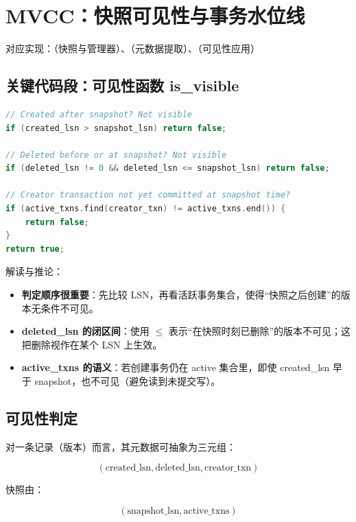 \section{MVCC：快照可见性与事务水位线}

对应实现：（快照与管理器）、（元数据提取）、（可见性应用）

\subsection{关键代码段：可见性函数 is\_visible}

\begin{lstlisting}[language=C++,caption={MVCCSnapshot::is\_visible 的判定顺序（节选）}]
// Created after snapshot? Not visible
if (created_lsn > snapshot_lsn) return false;

// Deleted before or at snapshot? Not visible
if (deleted_lsn != 0 && deleted_lsn <= snapshot_lsn) return false;

// Creator transaction not yet committed at snapshot time?
if (active_txns.find(creator_txn) != active_txns.end()) {
    return false;
}
return true;
\end{lstlisting}

解读与推论：

\begin{itemize}
  \item \textbf{判定顺序很重要}：先比较 LSN，再看活跃事务集合，使得“快照之后创建”的版本无条件不可见。
  \item \textbf{deleted\_lsn 的闭区间}：使用 \(\le\) 表示“在快照时刻已删除”的版本不可见；这把删除视作在某个 LSN 上生效。
  \item \textbf{active\_txns 的语义}：若创建事务仍在 active 集合里，即使 created\_lsn 早于 snapshot，也不可见（避免读到未提交写）。
\end{itemize}

\subsection{可见性判定}

对一条记录（版本）而言，其元数据可抽象为三元组：

\[
(\text{created\_lsn}, \text{deleted\_lsn}, \text{creator\_txn})
\]

快照由：

\[
(\text{snapshot\_lsn}, \text{active\_txns})
\]


